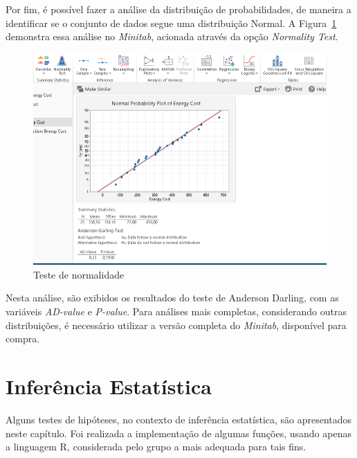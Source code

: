 \documentclass{article}
\begin{document}
Por fim, é possível fazer a análise da distribuição de probabilidades, de maneira a identificar se o conjunto de dados segue uma distribuição Normal. A Figura~\ref{fig:probanalises} demonstra essa análise no \emph{Minitab}, acionada através da opção \textit{Normality Test}.

\begin{figure}[!h]
    \centering
    \includegraphics[scale=0.75]{probanalise.png}
    \caption{Teste de normalidade}
    \label{fig:probanalises}
\end{figure}

Nesta análise, são exibidos os resultados do teste de Anderson Darling, com as variáveis \emph{AD-value} e \emph{P-value}. Para análises mais completas, considerando outras distribuições, é necessário utilizar a versão completa do \emph{Minitab}, disponível para compra.



\section{Inferência Estatística}

Alguns testes de hipóteses, no contexto de inferência estatística, são apresentados neste capítulo. Foi realizada a implementação de algumas funções, usando apenas a linguagem R, considerada pelo grupo a mais adequada para tais fins.
\end{document}

